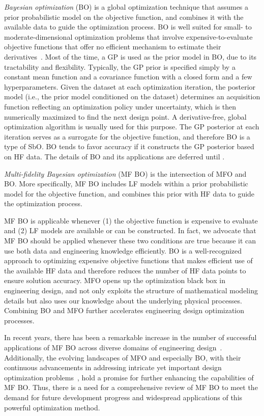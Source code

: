 \documentclass[journal ]{new-aiaa}
\begin{document}
\textit{Bayesian optimization} (BO) is a global optimization technique that assumes a prior probabilistic model on the objective function, and combines it with the available data to guide the optimization process.
BO is well suited for small- to moderate-dimensional optimization problems that involve expensive-to-evaluate objective functions that offer no efficient mechanism to estimate their derivatives~\citep{Snoek2012,Shahriari2016,Frazier2018}.
Most of the time, a GP is used as the prior model in BO, due to its tractability and flexibility.
Typically, the GP prior is specified simply by a constant mean function and a covariance function with a closed form and a few hyperparameters.
Given the dataset at each optimization iteration, the posterior model (i.e., the prior model conditioned on the dataset) determines an acquisition function reflecting an optimization policy under uncertainty, which is then numerically maximized to find the next design point.
A derivative-free, global optimization algorithm is usually used for this purpose.
The GP posterior at each iteration serves as a surrogate for the objective function, and therefore BO is a type of SbO.
BO tends to favor accuracy if it constructs the GP posterior based on HF data.
The details of BO and its applications are deferred until .  

\textit{Multi-fidelity Bayesian optimization} (MF BO) is the intersection of MFO and BO. More specifically, MF BO includes LF models within a prior probabilistic model for the objective function, and combines this prior with HF data to guide the optimization process.

MF BO is applicable whenever (1) the objective function is expensive to evaluate and (2) LF models are available or can be constructed.
In fact, we advocate that MF BO should be applied whenever these two conditions are true because it can use both data and engineering knowledge efficiently.
BO is a well-recognized approach to optimizing expensive objective functions that makes efficient use of the available HF data and therefore reduces the number of HF data points to ensure solution accuracy.
MFO opens up the optimization black box in engineering design, and not only exploits the structure of mathematical modeling details but also uses our knowledge about the underlying physical processes.
Combining BO and MFO further accelerates engineering design optimization processes.

In recent years, there has been a remarkable increase in the number of successful applications of MF BO across diverse domains of engineering design~\citep[see e.g.,][]{Perdikaris2017,Meliani2019,Tran2020cise,Hebbal2021oe,Khatamsaz2021md}.
Additionally, the evolving landscapes of MFO and especially BO, with their continuous advancements in addressing intricate yet important design optimization problems~\citep{Frazier2018,Wang2023}, hold a promise for further enhancing the capabilities of MF BO.
Thus, there is a need for a comprehensive review of MF BO to meet the demand for future development progress and widespread applications of this powerful optimization method.
\end{document}
